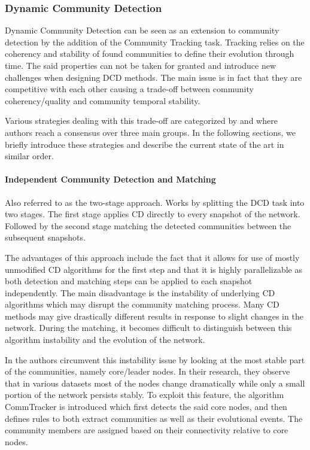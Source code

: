 \documentclass[
acmsmall,
nonacm,
screen,
acmthm]{acmart}
\begin{document}
\hypertarget{dynamic-community-detection}{%
\subsubsection{Dynamic Community
Detection}\label{dynamic-community-detection}}

Dynamic Community Detection can be seen as an extension to community
detection by the addition of the Community Tracking task. Tracking
relies on the coherency and stability of found communities to define
their evolution through time. The said properties can not be taken for
granted and introduce new challenges when designing DCD methods. The
main issue is in fact that they are competitive with each other causing
a trade-off between community coherency/quality and community temporal
stability.

Various strategies dealing with this trade-off are categorized by
\citet{rossettiCommunityDiscoveryDynamic2018} and
\citet{dakicheTrackingCommunityEvolution2019} where authors reach a
consensus over three main groups. In the following sections, we briefly
introduce these strategies and describe the current state of the art in
similar order.

\hypertarget{independent-community-detection-and-matching}{%
\paragraph{Independent Community Detection and
Matching}\label{independent-community-detection-and-matching}}

Also referred to as the two-stage approach. Works by splitting the DCD
task into two stages. The first stage applies CD directly to every
snapshot of the network. Followed by the second stage matching the
detected communities between the subsequent snapshots.

The advantages of this approach include the fact that it allows for use
of mostly unmodified CD algorithms for the first step and that it is
highly parallelizable as both detection and matching steps can be
applied to each snapshot independently. The main disadvantage is the
instability of underlying CD algorithms which may disrupt the community
matching process. Many CD methods may give drastically different results
in response to slight changes in the network. During the matching, it
becomes difficult to distinguish between this algorithm instability and
the evolution of the network.

In \citet{wangCommunityEvolutionSocial2008} the authors circumvent this
instability issue by looking at the most stable part of the communities,
namely core/leader nodes. In their research, they observe that in
various datasets most of the nodes change dramatically while only a
small portion of the network persists stably. To exploit this feature,
the algorithm CommTracker is introduced which first detects the said
core nodes, and then defines rules to both extract communities as well
as their evolutional events. The community members are assigned based on
their connectivity relative to core nodes.
\end{document}
